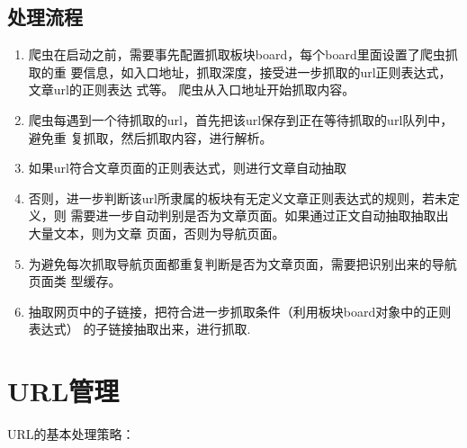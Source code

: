 \subsection{处理流程}

\begin{enumerate}
\item 爬虫在启动之前，需要事先配置抓取板块board，每个board里面设置了爬虫抓取的重
  要信息，如入口地址，抓取深度，接受进一步抓取的url正则表达式，文章url的正则表达
  式等。 爬虫从入口地址开始抓取内容。

\item 爬虫每遇到一个待抓取的url，首先把该url保存到正在等待抓取的url队列中，避免重
  复抓取，然后抓取内容，进行解析。

\item 如果url符合文章页面的正则表达式，则进行文章自动抽取

\item 否则，进一步判断该url所隶属的板块有无定义文章正则表达式的规则，若未定义，则
  需要进一步自动判别是否为文章页面。如果通过正文自动抽取抽取出大量文本，则为文章
  页面，否则为导航页面。

\item 为避免每次抓取导航页面都重复判断是否为文章页面，需要把识别出来的导航页面类
  型缓存。

\item 抽取网页中的子链接，把符合进一步抓取条件（利用板块board对象中的正则表达式）
  的子链接抽取出来，进行抓取.

\end{enumerate}

\section{URL管理}

URL的基本处理策略：

